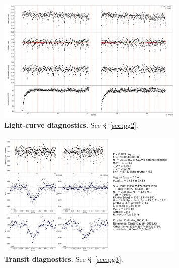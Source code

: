 \documentclass[12pt,twocolumn,tighten]{aastex62}
\begin{document}
\begin{figure}[!h]
	\begin{center}
		\leavevmode
		\includegraphics[width=0.8\textwidth]{pg_0002.pdf}
	\end{center}
	\vspace{-0.5cm}
	\caption{
		{\bf Light-curve diagnostics.} See \S~\ref{sec:pg2}.
		\label{fig:pg2}
	}
\end{figure}

\begin{figure}[!h]
	\begin{center}
		\leavevmode
		\includegraphics[width=0.8\textwidth]{pg_0003.pdf}
	\end{center}
	\vspace{-0.5cm}
	\caption{
    {\bf Transit diagnostics.}  See \S~\ref{sec:pg3}.
		\label{fig:pg3}
	}
\end{figure}
\end{document}
